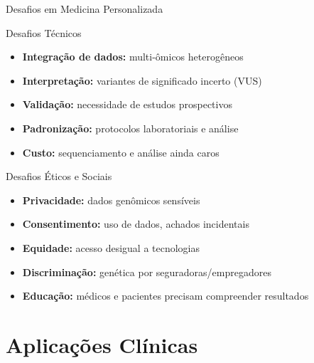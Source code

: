 \begin{frame}{Desafios em Medicina Personalizada}
\begin{alertblock}{Desafios Técnicos}
\begin{itemize}
    \item \textbf{Integração de dados:} multi-ômicos heterogêneos
    \item \textbf{Interpretação:} variantes de significado incerto (VUS)
    \item \textbf{Validação:} necessidade de estudos prospectivos
    \item \textbf{Padronização:} protocolos laboratoriais e análise
    \item \textbf{Custo:} sequenciamento e análise ainda caros
\end{itemize}
\end{alertblock}

\vspace{0.3cm}

\begin{alertblock}{Desafios Éticos e Sociais}
\begin{itemize}
    \item \textbf{Privacidade:} dados genômicos sensíveis
    \item \textbf{Consentimento:} uso de dados, achados incidentais
    \item \textbf{Equidade:} acesso desigual a tecnologias
    \item \textbf{Discriminação:} genética por seguradoras/empregadores
    \item \textbf{Educação:} médicos e pacientes precisam compreender resultados
\end{itemize}
\end{alertblock}

\end{frame}

\section{Aplicações Clínicas}

